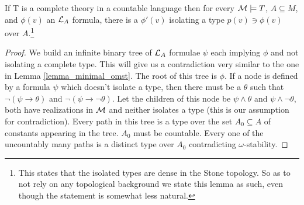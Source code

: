 \begin{lemma}\label{isolated_types_are_dense}
If T is a complete \omst theory in a countable language then for every \(\mathcal{M} \models T\), \(A \subseteq M\), and \(\phi(v)\) an \(\mathcal{L}_A\) formula, there is a \(\phi'(v)\) isolating a type \(p(v) \ni \phi(v)\) over \(A\).\footnote{This states that the isolated types are dense in the Stone topology. So as to not rely on any topological background we state this lemma as such, even though the statement is somewhat less natural.}
\end{lemma}

\begin{proof}
We build an infinite binary tree of \(\mathcal{L}_A\) formulae \(\psi\) each implying \(\phi\) and not isolating a complete type.
This will give us a contradiction very similar to the one in Lemma \ref{lemma_minimal_omst}.
The root of this tree is \(\phi\).
If a node is defined by a formula \(\psi\) which doesn't isolate a type, then there must be a \(\theta\) such that \(\neg(\psi \to \theta)\) and \(\neg(\psi \to \neg \theta)\). 
Let the children of this node be \(\psi \land \theta\) and \(\psi \land \neg \theta\), both have realizations in \(\mathcal{M}\) and neither isolates a type (this is our assumption for contradiction).
Every path in this tree is a type over the set \(A_0 \subseteq A\) of constants appearing in the tree. 
\(A_0\) must be countable. 
Every one of the uncountably many paths is a distinct type over \(A_0\) contradicting \(\omega\)-stability. 
\end{proof}

